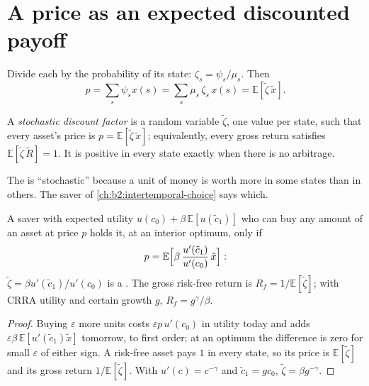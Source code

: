 \section{A price as an expected discounted payoff}\label{sec:b2:asset-prices:sdf}

Divide each  by the probability of its state: $\zeta_s = \psi_s/\mu_s$. Then
\[
p = \sum_s \psi_s x(s) = \sum_s \mu_s\,\zeta_s\,x(s) = \mathbb{E}[\tilde\zeta\,\tilde x].
\]

\begin{definition}\label{def:b2:asset-prices:sdf}
A \emph{stochastic discount factor} is a random variable
$\tilde\zeta$, one value per state, such that every asset's price is $p = \mathbb{E}[\tilde\zeta\,\tilde
x]$; equivalently, every gross return satisfies $\mathbb{E}[\tilde\zeta\,\tilde R] = 1$. It is positive
in every state exactly when there is no arbitrage.
\end{definition}

The  is ``stochastic'' because a unit of money is worth more in some states than in
others. The saver of \cref{ch:b2:intertemporal-choice} says which.

\begin{proposition}\label{prop:b2:asset-prices:consumption-sdf}
A saver with expected utility $u(c_0) + \beta\,\mathbb{E}[u(\tilde c_1)]$ who can buy any amount of an
asset at price $p$ holds it, at an interior optimum, only if
\[
p = \mathbb{E}\Bigl[\beta\,\frac{u'(\tilde c_1)}{u'(c_0)}\,\tilde x\Bigr]:
\]
$\tilde\zeta = \beta u'(\tilde c_1)/u'(c_0)$ is a . The gross risk-free return
is $R_f = 1/\mathbb{E}[\tilde\zeta]$; with CRRA utility and certain growth $g$, $R_f = g^{\gamma}/\beta$.
\end{proposition}

\begin{proof}
Buying $\varepsilon$ more units costs $\varepsilon p\,u'(c_0)$ in utility today and adds
$\varepsilon\beta\,\mathbb{E}[u'(\tilde c_1)\tilde x]$ tomorrow, to first order; at an optimum the
difference is zero for small $\varepsilon$ of either sign. A risk-free asset pays $1$ in every state, so
its price is $\mathbb{E}[\tilde\zeta]$ and its gross return $1/\mathbb{E}[\tilde\zeta]$. With $u'(c) =
c^{-\gamma}$ and $\tilde c_1 = gc_0$, $\tilde\zeta = \beta g^{-\gamma}$.
\end{proof}

